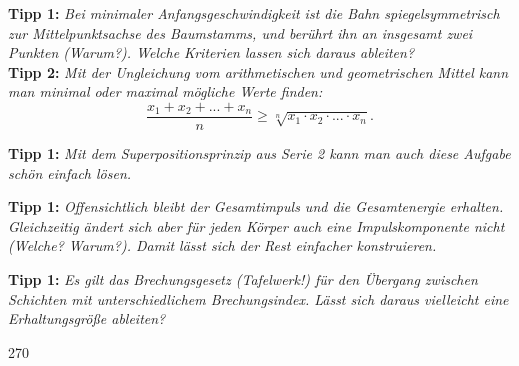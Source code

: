 \documentclass[a4paper]{article}
\begin{document}

\textbf{Tipp 1:}
\textit{Bei minimaler Anfangsgeschwindigkeit ist die Bahn spiegelsymmetrisch zur Mittelpunktsachse des Baumstamms, und berührt ihn an insgesamt zwei Punkten (Warum?). Welche Kriterien lassen sich daraus ableiten?}
\\
\textbf{Tipp 2:}
\textit{Mit der Ungleichung vom arithmetischen und geometrischen Mittel kann man minimal oder maximal mögliche Werte finden:}
\begin{equation*}
	\frac{x_1+x_2+...+x_n}{n} \geq \sqrt[n]{x_1\cdot x_2 \cdot ... \cdot x_n}.
\end{equation*}

\textbf{Tipp 1:}
\textit{Mit dem Superpositionsprinzip aus Serie 2 kann man auch diese Aufgabe schön einfach lösen.}

\textbf{Tipp 1:}
\textit{Offensichtlich bleibt der Gesamtimpuls und die Gesamtenergie erhalten. Gleichzeitig ändert sich aber für jeden Körper auch eine Impulskomponente nicht (Welche? Warum?). Damit  lässt sich der Rest einfacher konstruieren. }
\newpage

\textbf{Tipp 1:}
\textit{Es gilt das Brechungsgesetz (Tafelwerk!) für den Übergang zwischen Schichten mit unterschiedlichem Brechungsindex. Lässt sich daraus vielleicht eine Erhaltungsgröße ableiten?}

\newpage
	\hspace{4cm}
	\vspace{-1cm}
\begin{turn}{270}


\end{turn}
\end{document}
